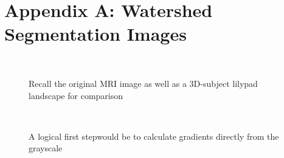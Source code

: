 \documentclass[12pt]{article}
\theoremstyle{plain}%
\theoremstyle{definition}
\theoremstyle{remark}
\begin{document}
\section{Appendix A: Watershed Segmentation Images}
\begin{figure}[!h]
\centering
\mbox{\quad
{}}
\caption{Recall the original MRI image as well as a 3D-subject lilypad landscape for comparison}
\end{figure}
\begin{figure}[!h]
\centering
\mbox{\quad
{}}
\caption{A logical first stepwould be to calculate gradients directly from the grayscale}
\end{figure}
\end{document}
